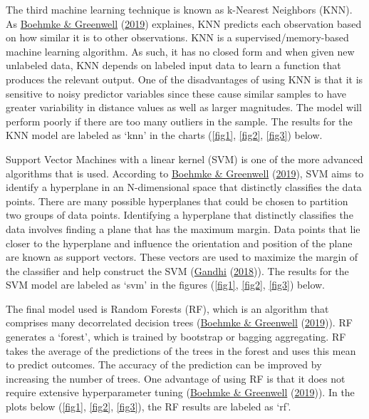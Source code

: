 \documentclass[11pt,preprint, authoryear]{elsarticle}
\numberwithin{equation}{section}
\numberwithin{figure}{section}
\numberwithin{table}{section}
\begin{document}
The third machine learning technique is known as k-Nearest Neighbors
(KNN). As \protect\hyperlink{ref-book}{Boehmke \& Greenwell}
(\protect\hyperlink{ref-book}{2019}) explaines, KNN predicts each
observation based on how similar it is to other observations. KNN is a
supervised/memory-based machine learning algorithm. As such, it has no
closed form and when given new unlabeled data, KNN depends on labeled
input data to learn a function that produces the relevant output. One of
the disadvantages of using KNN is that it is sensitive to noisy
predictor variables since these cause similar samples to have greater
variability in distance values as well as larger magnitudes. The model
will perform poorly if there are too many outliers in the sample. The
results for the KNN model are labeled as `knn' in the charts
(\ref{fig1}, \ref{fig2}, \ref{fig3}) below.

Support Vector Machines with a linear kernel (SVM) is one of the more
advanced algorithms that is used. According to
\protect\hyperlink{ref-book}{Boehmke \& Greenwell}
(\protect\hyperlink{ref-book}{2019}), SVM aims to identify a hyperplane
in an N-dimensional space that distinctly classifies the data points.
There are many possible hyperplanes that could be chosen to partition
two groups of data points. Identifying a hyperplane that distinctly
classifies the data involves finding a plane that has the maximum
margin. Data points that lie closer to the hyperplane and influence the
orientation and position of the plane are known as support vectors.
These vectors are used to maximize the margin of the classifier and help
construct the SVM (\protect\hyperlink{ref-svm}{Gandhi}
(\protect\hyperlink{ref-svm}{2018})). The results for the SVM model are
labeled as `svm' in the figures (\ref{fig1}, \ref{fig2}, \ref{fig3})
below.

The final model used is Random Forests (RF), which is an algorithm that
comprises many decorrelated decision trees
(\protect\hyperlink{ref-book}{Boehmke \& Greenwell}
(\protect\hyperlink{ref-book}{2019})). RF generates a `forest', which is
trained by bootstrap or bagging aggregating. RF takes the average of the
predictions of the trees in the forest and uses this mean to predict
outcomes. The accuracy of the prediction can be improved by increasing
the number of trees. One advantage of using RF is that it does not
require extensive hyperparameter tuning
(\protect\hyperlink{ref-book}{Boehmke \& Greenwell}
(\protect\hyperlink{ref-book}{2019})). In the plots below (\ref{fig1},
\ref{fig2}, \ref{fig3}), the RF results are labeled as `rf'.
\end{document}
